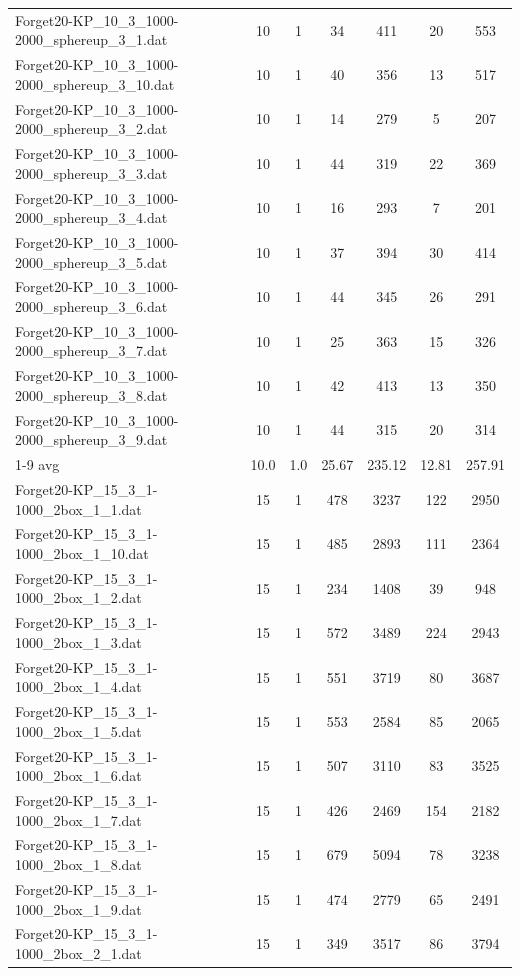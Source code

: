 \begin{table}[!ht]
\begin{tabular}{lcccccc}
Forget20-KP\_10\_3\_1000-2000\_sphereup\_3\_1.dat & 10 & 1 & 34 & 411 & 20 & 553 \\
Forget20-KP\_10\_3\_1000-2000\_sphereup\_3\_10.dat & 10 & 1 & 40 & 356 & 13 & 517 \\
Forget20-KP\_10\_3\_1000-2000\_sphereup\_3\_2.dat & 10 & 1 & 14 & 279 & 5 & 207 \\
Forget20-KP\_10\_3\_1000-2000\_sphereup\_3\_3.dat & 10 & 1 & 44 & 319 & 22 & 369 \\
Forget20-KP\_10\_3\_1000-2000\_sphereup\_3\_4.dat & 10 & 1 & 16 & 293 & 7 & 201 \\
Forget20-KP\_10\_3\_1000-2000\_sphereup\_3\_5.dat & 10 & 1 & 37 & 394 & 30 & 414 \\
Forget20-KP\_10\_3\_1000-2000\_sphereup\_3\_6.dat & 10 & 1 & 44 & 345 & 26 & 291 \\
Forget20-KP\_10\_3\_1000-2000\_sphereup\_3\_7.dat & 10 & 1 & 25 & 363 & 15 & 326 \\
Forget20-KP\_10\_3\_1000-2000\_sphereup\_3\_8.dat & 10 & 1 & 42 & 413 & 13 & 350 \\
Forget20-KP\_10\_3\_1000-2000\_sphereup\_3\_9.dat & 10 & 1 & 44 & 315 & 20 & 314 \\
\cline{1-9} avg & 10.0 & 1.0 & 25.67& 235.12 & 12.81& 257.91\\ \hline
Forget20-KP\_15\_3\_1-1000\_2box\_1\_1.dat & 15 & 1 & 478 & 3237 & 122 & 2950 \\
Forget20-KP\_15\_3\_1-1000\_2box\_1\_10.dat & 15 & 1 & 485 & 2893 & 111 & 2364 \\
Forget20-KP\_15\_3\_1-1000\_2box\_1\_2.dat & 15 & 1 & 234 & 1408 & 39 & 948 \\
Forget20-KP\_15\_3\_1-1000\_2box\_1\_3.dat & 15 & 1 & 572 & 3489 & 224 & 2943 \\
Forget20-KP\_15\_3\_1-1000\_2box\_1\_4.dat & 15 & 1 & 551 & 3719 & 80 & 3687 \\
Forget20-KP\_15\_3\_1-1000\_2box\_1\_5.dat & 15 & 1 & 553 & 2584 & 85 & 2065 \\
Forget20-KP\_15\_3\_1-1000\_2box\_1\_6.dat & 15 & 1 & 507 & 3110 & 83 & 3525 \\
Forget20-KP\_15\_3\_1-1000\_2box\_1\_7.dat & 15 & 1 & 426 & 2469 & 154 & 2182 \\
Forget20-KP\_15\_3\_1-1000\_2box\_1\_8.dat & 15 & 1 & 679 & 5094 & 78 & 3238 \\
Forget20-KP\_15\_3\_1-1000\_2box\_1\_9.dat & 15 & 1 & 474 & 2779 & 65 & 2491 \\
Forget20-KP\_15\_3\_1-1000\_2box\_2\_1.dat & 15 & 1 & 349 & 3517 & 86 & 3794 \\

\end{tabular}
\end{table}
